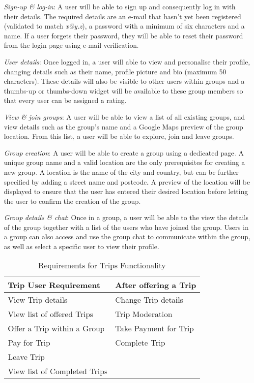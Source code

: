 \documentclass{article}
\begin{document}
    \emph{Sign-up \& log-in}: A user will be able to sign up and consequently log in with their details. The required details are an e-mail that hasn't yet been registered (validated to match \emph{x@y.z}), a password with a minimum of six characters and a name. If a user forgets their password, they will be able to reset their password from the login page using e-mail verification.
    
    \emph{User details}: Once logged in, a user will able to view and personalise their profile, changing details such as their name, profile picture and bio (maximum 50 characters). These details will also be visible to other users within groups and a thumbs-up or thumbs-down widget will be available to these group members so that every user can be assigned a rating.
    
    \emph{View \& join groups}: A user will be able to view a list of all existing groups, and view details such as the group's name and a Google Maps preview of the group location. From this list, a user will be able to explore, join and leave groups. 
    
    \emph{Group creation}: A user will be able to create a group using a dedicated page. A unique group name and a valid location are the only prerequisites for creating a new group. A location is the name of the city and country, but can be further specified by adding a street name and postcode. A preview of the location will be displayed to ensure that the user has entered their desired location before letting the user to confirm the creation of the group. 
    
    \emph{Group details \& chat}: Once in a group, a user will be able to the view the details of the group together with a list of the users who have joined the group. Users in a group can also access and use the group chat to communicate within the group, as well as select a specific user to view their profile. \par
    
    \begin{table}[ht]
        \centering
        
        \begin{tabular}{@{}ll@{}} \toprule
        Trip User Requirement           & After offering a Trip     \\\midrule
        View Trip details               & Change Trip details       \\[3pt]
        View list of offered Trips      & Trip Moderation           \\[3pt]
        Offer a Trip within a Group     & Take Payment for Trip     \\[3pt]
        Pay for Trip                    & Complete Trip             \\[3pt]
        Leave Trip                      &                           \\[3pt]
        View list of Completed Trips    &                           \\\bottomrule
        \end{tabular}
        \caption{Requirements for Trips Functionality}
        \label{tab:tripfunctionality}
    \end{table}
    
\end{document}
